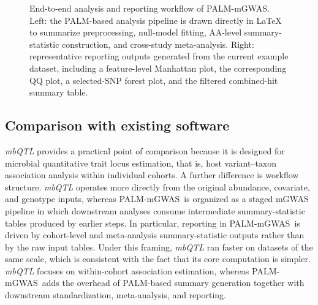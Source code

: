 \documentclass[10pt,twocolumn]{article}
\newcommand{\software}{PALM-mGWAS}
\begin{document}
\begin{figure}[t]
\begin{minipage}[c]{0.58\textwidth}
\vspace{0.35em}
\centering
\tiny
\setlength{\tabcolsep}{2pt}
\end{minipage}
\caption{End-to-end analysis and reporting workflow of \software. Left: the PALM-based analysis pipeline is drawn directly in \LaTeX{} to summarize preprocessing, null-model fitting, AA-level summary-statistic construction, and cross-study meta-analysis. Right: representative reporting outputs generated from the current example dataset, including a feature-level Manhattan plot, the corresponding QQ plot, a selected-SNP forest plot, and the filtered combined-hit summary table.}
\label{fig:workflowviz}
\end{figure}

\subsection{Comparison with existing software}
\textit{mbQTL} provides a practical point of comparison because it is designed for microbial quantitative trait locus estimation, that is, host variant--taxon association analysis within individual cohorts. A further difference is workflow structure. \textit{mbQTL} operates more directly from the original abundance, covariate, and genotype inputs, whereas \software\ is organized as a staged mGWAS pipeline in which downstream analyses consume intermediate summary-statistic tables produced by earlier steps. In particular, reporting in \software\ is driven by cohort-level and meta-analysis summary-statistic outputs rather than by the raw input tables. Under this framing, \textit{mbQTL} ran faster on datasets of the same scale, which is consistent with the fact that its core computation is simpler. \textit{mbQTL} focuses on within-cohort association estimation, whereas \software\ adds the overhead of PALM-based summary generation together with downstream standardization, meta-analysis, and reporting.
\end{document}
